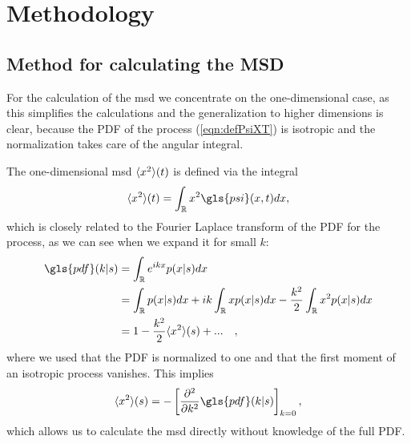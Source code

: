 \chapter{Methodology}

\section{Method for calculating the MSD} 

For the calculation of the \gls{msd} we concentrate on the one-dimensional case, as this simplifies the calculations and the generalization to higher dimensions is clear, because the \gls{PDF} of the process (\ref{eqn:defPsiXT}) is isotropic and the normalization takes care of the angular integral. 

The one-dimensional \gls{msd} $\langle x^2 \rangle(t)$ is defined via the integral 
%
\begin{align}
\mean{x^2}(t) = \int_{\mathbb{R}} x^2 \gls{psi}(x,t) dx ,
\end{align}
%
which is closely related to the Fourier Laplace transform of the \gls{PDF} for the process, as we can see when we expand it for small $k$:
%
\begin{align}
\gls{pdf}(k|s) &= \int_{\mathbb{R}}  e^{ik x} p(x|s) dx  \\
&= \int_{\mathbb{R}}   p(x|s) dx +  i k \int_{\mathbb{R}}   x p(x|s) dx - \frac{k^2}{2} \int_{\mathbb{R}}   x^2 p(x|s) dx \\
&= 1 - \frac{k^2}{2} \mean{x^2}(s)  + ... \quad ,
\end{align}
%
where we used that the \gls{PDF} is normalized to one and that the first moment of an isotropic process vanishes. This implies 
%
\begin{align}
\mean{x^2}(s) = - \left[ \npder{}{k}{2} \gls{pdf}(k|s) \right]_{k=0} \label{eqn:MSDDerivative}, 
\end{align}
%
which allows us to calculate the \gls{msd} directly without knowledge of the full \gls{PDF}.

